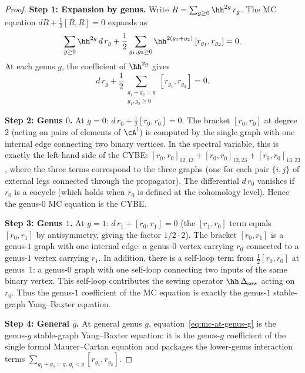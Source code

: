 \begin{proof}
\noindent\textbf{Step 1: Expansion by genus.}
Write $R = \sum_{g \ge 0} \hh^{2g}\, r_g$.
The MC equation $dR + \frac{1}{2}[R, R] = 0$ expands as
\begin{equation}
\sum_{g \ge 0} \hh^{2g}\, d\, r_g
+ \frac{1}{2} \sum_{g_1, g_2 \ge 0}
\hh^{2(g_1 + g_2)}\, [r_{g_1}, r_{g_2}] = 0.
\end{equation}
At each genus $g$, the coefficient of $\hh^{2g}$ gives
\begin{equation}
d\, r_g
+ \frac{1}{2} \sum_{\substack{g_1 + g_2 = g \\ g_1, g_2 \ge 0}}
[r_{g_1}, r_{g_2}] = 0.
\end{equation}

\medskip
\noindent\textbf{Step 2: Genus $0$.}
At $g = 0$: $d\, r_0 + \frac{1}{2}[r_0, r_0] = 0$. The
bracket $[r_0, r_0]$ at degree $2$ (acting on pairs of elements
of $\cA^!$) is computed by the single graph with one internal
edge connecting two binary vertices. In the spectral variable,
this is exactly the left-hand side of the CYBE:
$[r_0, r_0]_{12,13} + [r_0, r_0]_{12,23}
+ [r_0, r_0]_{13,23}$, where the three terms correspond to the
three graphs (one for each pair $\{i,j\}$ of external legs
connected through the propagator). The differential $d\, r_0$
vanishes if $r_0$ is a cocycle (which holds when $r_0$ is
defined at the cohomology level). Hence the genus-$0$ MC
equation is the CYBE.

\medskip
\noindent\textbf{Step 3: Genus $1$.}
At $g = 1$: $d\, r_1 + [r_0, r_1] = 0$ (the $[r_1, r_0]$
term equals $[r_0, r_1]$ by antisymmetry, giving the factor
$1/2 \cdot 2$). The bracket $[r_0, r_1]$ is a genus-$1$
graph with one internal edge: a genus-$0$ vertex carrying $r_0$
connected to a genus-$1$ vertex carrying $r_1$. In addition,
there is a self-loop term from $\frac{1}{2}[r_0, r_0]$ at
genus~$1$: a genus-$0$ graph with one self-loop connecting two
inputs of the same binary vertex. This self-loop contributes
the sewing operator $\hh\,\Delta_{\mathrm{sew}}$ acting on
$r_0$. Thus the genus-$1$ coefficient of the MC equation is
exactly the genus-$1$ stable-graph Yang--Baxter equation.

\medskip
\noindent\textbf{Step 4: General $g$.}
At general genus $g$, equation~\eqref{eq:mc-at-genus-g} is the
genus-$g$ stable-graph Yang--Baxter equation: it is the genus-$g$
coefficient of the single formal Maurer--Cartan equation and packages
the lower-genus interaction terms
$\sum_{g_1+g_2=g,\, g_i < g} [r_{g_1}, r_{g_2}]$.


\end{proof}
